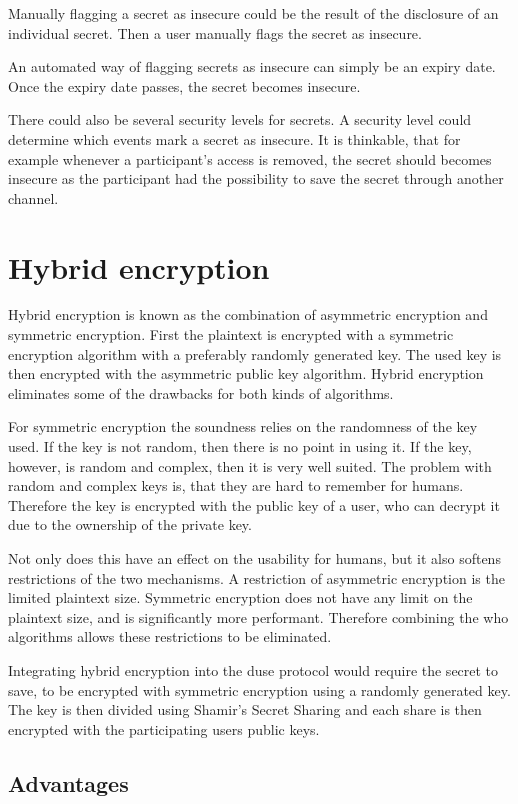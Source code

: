Manually flagging a secret as insecure could be the result of the disclosure of
an individual secret. Then a user manually flags the secret as insecure.

An automated way of flagging secrets as insecure can simply be an expiry date.
Once the expiry date passes, the secret becomes insecure.

There could also be several security levels for secrets. A security level could
determine which events mark a secret as insecure. It is thinkable, that for
example whenever a participant's access is removed, the secret should becomes
insecure as the participant had the possibility to save the secret through
another channel.

\section{Hybrid encryption}

Hybrid encryption is known as the combination of asymmetric encryption and
symmetric encryption. First the plaintext is encrypted with a symmetric
encryption algorithm with a preferably randomly generated key. The used key is
then encrypted with the asymmetric public key algorithm. Hybrid encryption
eliminates some of the drawbacks for both kinds of algorithms.

For symmetric encryption the soundness relies on the randomness of the key
used. If the key is not random, then there is no point in using it. If the key,
however, is random and complex, then it is very well suited. The problem with
random and complex keys is, that they are hard to remember for humans.
Therefore the key is encrypted with the public key of a user, who can decrypt
it due to the ownership of the private key.

Not only does this have an effect on the usability for humans, but it also
softens restrictions of the two mechanisms. A restriction of asymmetric
encryption is the limited plaintext size. Symmetric encryption does not have
any limit on the plaintext size, and is significantly more performant.
Therefore combining the who algorithms allows these restrictions to be
eliminated.

Integrating hybrid encryption into the duse protocol would require the secret
to save, to be encrypted with symmetric encryption using a randomly generated
key. The key is then divided using Shamir's Secret Sharing and each share is
then encrypted with the participating users public keys.

\subsection{Advantages}


